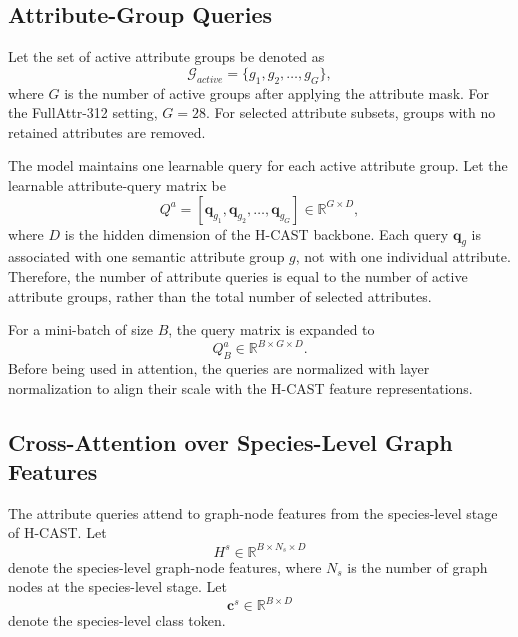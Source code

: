 \subsection{Attribute-Group Queries}

Let the set of active attribute groups be denoted as
\begin{equation}
    \mathcal{G}_{active}
    =
    \{g_1, g_2, \ldots, g_G\},
\end{equation}
where \(G\) is the number of active groups after applying the attribute mask. For the FullAttr-312 setting, \(G=28\). For selected attribute subsets, groups with no retained attributes are removed.

The model maintains one learnable query for each active attribute group. Let the learnable attribute-query matrix be
\begin{equation}
    Q^{a}
    =
    [\mathbf{q}_{g_1}, \mathbf{q}_{g_2}, \ldots, \mathbf{q}_{g_G}]
    \in \mathbb{R}^{G \times D},
\end{equation}
where \(D\) is the hidden dimension of the H-CAST backbone. Each query \(\mathbf{q}_{g}\) is associated with one semantic attribute group \(g\), not with one individual attribute. Therefore, the number of attribute queries is equal to the number of active attribute groups, rather than the total number of selected attributes.

For a mini-batch of size \(B\), the query matrix is expanded to
\begin{equation}
    Q^{a}_{B}
    \in
    \mathbb{R}^{B \times G \times D}.
\end{equation}
Before being used in attention, the queries are normalized with layer normalization to align their scale with the H-CAST feature representations.

\subsection{Cross-Attention over Species-Level Graph Features}

The attribute queries attend to graph-node features from the species-level stage of H-CAST. Let
\begin{equation}
    H^{s}
    \in
    \mathbb{R}^{B \times N_s \times D}
\end{equation}
denote the species-level graph-node features, where \(N_s\) is the number of graph nodes at the species-level stage. Let
\begin{equation}
    \mathbf{c}^{s}
    \in
    \mathbb{R}^{B \times D}
\end{equation}
denote the species-level class token.

